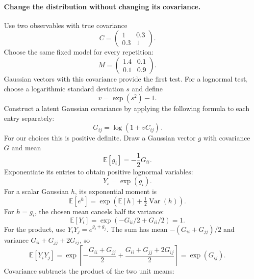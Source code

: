 \documentclass[11pt]{article}
\newcommand{\E}{\mathbb{E}}
\newcommand{\Var}{\operatorname{Var}}
\begin{document}
\paragraph{Change the distribution without changing its covariance.}
Use two observables with true covariance
\begin{equation}
 C=\begin{pmatrix}1&0.3\\0.3&1\end{pmatrix}.
\end{equation}
Choose the same fixed model for every repetition:
\begin{equation}
 M=\begin{pmatrix}1.4&0.1\\0.1&0.9\end{pmatrix}.
\end{equation}
Gaussian vectors with this covariance provide the first test. For a
lognormal test, choose a logarithmic standard deviation $s$ and define
\begin{equation}
 v=\exp(s^2)-1.
\end{equation}
Construct a latent Gaussian covariance by applying the following formula
to each entry separately:
\begin{equation}
 G_{ij}=\log(1+vC_{ij}).
\end{equation}
For our choices this is positive definite. Draw a Gaussian vector $g$ with
covariance $G$ and mean
\begin{equation}
 \E[g_i]=-\frac12G_{ii}.
\end{equation}
Exponentiate its entries to obtain positive lognormal variables:
\begin{equation}
 Y_i=\exp(g_i).
\end{equation}
For a scalar Gaussian $h$, its exponential moment is
\begin{equation}
 \E[e^h]=\exp\left(\E[h]+\tfrac12\Var(h)\right).
\end{equation}
For $h=g_i$, the chosen mean cancels half its variance:
\begin{equation}
 \E[Y_i]=\exp(-G_{ii}/2+G_{ii}/2)=1.
\end{equation}
For the product, use $Y_iY_j=e^{g_i+g_j}$. The sum has mean
$-(G_{ii}+G_{jj})/2$ and variance $G_{ii}+G_{jj}+2G_{ij}$, so
\begin{equation}
 \E[Y_iY_j]
 =\exp\left[-\frac{G_{ii}+G_{jj}}2+
             \frac{G_{ii}+G_{jj}+2G_{ij}}2\right]
 =\exp(G_{ij}).
\end{equation}
Covariance subtracts the product of the two unit means:
\end{document}
